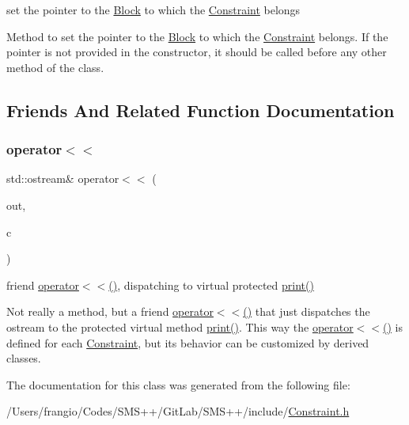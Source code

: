 set the pointer to the \mbox{\hyperlink{class_s_m_spp__di__unipi__it_1_1_block}{Block}} to which the \mbox{\hyperlink{class_s_m_spp__di__unipi__it_1_1_constraint}{Constraint}} belongs 

Method to set the pointer to the \mbox{\hyperlink{class_s_m_spp__di__unipi__it_1_1_block}{Block}} to which the \mbox{\hyperlink{class_s_m_spp__di__unipi__it_1_1_constraint}{Constraint}} belongs. If the pointer is not provided in the constructor, it should be called before any other method of the class. 

\subsection{Friends And Related Function Documentation}
\mbox{\label{class_s_m_spp__di__unipi__it_1_1_constraint_a4f47f7bc7b271e73c2b4f89bf8f3e592}} 
\subsubsection{\texorpdfstring{operator$<$$<$}{operator<<}}
{\footnotesize\ttfamily std\+::ostream\& operator$<$$<$ (\begin{DoxyParamCaption}\item[{std\+::ostream \&}]{out,  }\item[{const \mbox{\hyperlink{class_s_m_spp__di__unipi__it_1_1_constraint}{Constraint}} \&}]{c }\end{DoxyParamCaption})\hspace{0.3cm}{\ttfamily [friend]}}



friend \mbox{\hyperlink{class_s_m_spp__di__unipi__it_1_1_constraint_a4f47f7bc7b271e73c2b4f89bf8f3e592}{operator$<$$<$()}}, dispatching to virtual protected \mbox{\hyperlink{class_s_m_spp__di__unipi__it_1_1_constraint_a2e7b9c9148a98c5c342e8c25cac95926}{print()}} 

Not really a method, but a friend \mbox{\hyperlink{class_s_m_spp__di__unipi__it_1_1_constraint_a4f47f7bc7b271e73c2b4f89bf8f3e592}{operator$<$$<$()}} that just dispatches the ostream to the protected virtual method \mbox{\hyperlink{class_s_m_spp__di__unipi__it_1_1_constraint_a2e7b9c9148a98c5c342e8c25cac95926}{print()}}. This way the \mbox{\hyperlink{class_s_m_spp__di__unipi__it_1_1_constraint_a4f47f7bc7b271e73c2b4f89bf8f3e592}{operator$<$$<$()}} is defined for each \mbox{\hyperlink{class_s_m_spp__di__unipi__it_1_1_constraint}{Constraint}}, but its behavior can be customized by derived classes. 

The documentation for this class was generated from the following file\+:\begin{DoxyCompactItemize}
\item 
/\+Users/frangio/\+Codes/\+S\+M\+S++/\+Git\+Lab/\+S\+M\+S++/include/\mbox{\hyperlink{_constraint_8h}{Constraint.\+h}}\end{DoxyCompactItemize}
